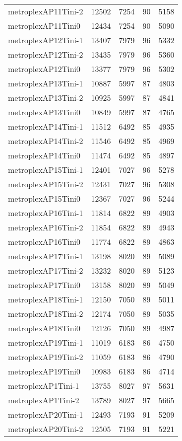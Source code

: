 \begin{longtable}{lrrrr}
metroplexAP11Tini-2 & 12502 & 7254 & 90 & 5158 \\
metroplexAP11Tini0 & 12434 & 7254 & 90 & 5090 \\
metroplexAP12Tini-1 & 13407 & 7979 & 96 & 5332 \\
metroplexAP12Tini-2 & 13435 & 7979 & 96 & 5360 \\
metroplexAP12Tini0 & 13377 & 7979 & 96 & 5302 \\
metroplexAP13Tini-1 & 10887 & 5997 & 87 & 4803 \\
metroplexAP13Tini-2 & 10925 & 5997 & 87 & 4841 \\
metroplexAP13Tini0 & 10849 & 5997 & 87 & 4765 \\
metroplexAP14Tini-1 & 11512 & 6492 & 85 & 4935 \\
metroplexAP14Tini-2 & 11546 & 6492 & 85 & 4969 \\
metroplexAP14Tini0 & 11474 & 6492 & 85 & 4897 \\
metroplexAP15Tini-1 & 12401 & 7027 & 96 & 5278 \\
metroplexAP15Tini-2 & 12431 & 7027 & 96 & 5308 \\
metroplexAP15Tini0 & 12367 & 7027 & 96 & 5244 \\
metroplexAP16Tini-1 & 11814 & 6822 & 89 & 4903 \\
metroplexAP16Tini-2 & 11854 & 6822 & 89 & 4943 \\
metroplexAP16Tini0 & 11774 & 6822 & 89 & 4863 \\
metroplexAP17Tini-1 & 13198 & 8020 & 89 & 5089 \\
metroplexAP17Tini-2 & 13232 & 8020 & 89 & 5123 \\
metroplexAP17Tini0 & 13158 & 8020 & 89 & 5049 \\
metroplexAP18Tini-1 & 12150 & 7050 & 89 & 5011 \\
metroplexAP18Tini-2 & 12174 & 7050 & 89 & 5035 \\
metroplexAP18Tini0 & 12126 & 7050 & 89 & 4987 \\
metroplexAP19Tini-1 & 11019 & 6183 & 86 & 4750 \\
metroplexAP19Tini-2 & 11059 & 6183 & 86 & 4790 \\
metroplexAP19Tini0 & 10983 & 6183 & 86 & 4714 \\
metroplexAP1Tini-1 & 13755 & 8027 & 97 & 5631 \\
metroplexAP1Tini-2 & 13789 & 8027 & 97 & 5665 \\
metroplexAP20Tini-1 & 12493 & 7193 & 91 & 5209 \\
metroplexAP20Tini-2 & 12505 & 7193 & 91 & 5221 \\

\end{longtable}
